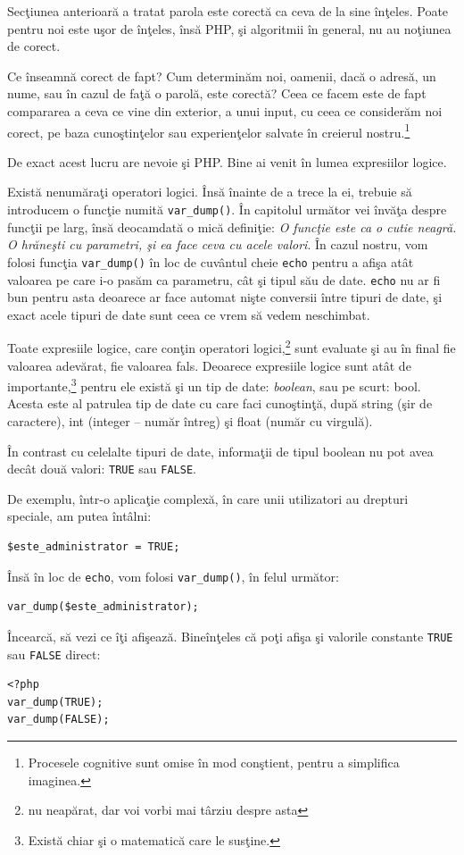 Secţiunea anterioară a tratat {\glqq}parola este corectă{\grqq} ca ceva
de la sine înţeles. Poate pentru noi este uşor de înţeles,
însă PHP, şi algoritmii în general, nu au noţiunea de {\glqq}corect{\grqq}.

Ce înseamnă {\glqq}corect{\grqq} de fapt? Cum determinăm noi, oamenii,
dacă o adresă, un nume, sau în cazul de faţă o parolă, este corectă?
Ceea ce facem este de fapt compararea a ceva ce vine din exterior, a
unui input, cu ceea ce considerăm noi {\glqq}corect{\grqq}, pe baza cunoştinţelor
sau experienţelor {\glqq}salvate{\grqq} în creierul nostru.\footnote{Procesele
cognitive sunt omise în mod conştient, pentru a simplifica imaginea.}

De exact acest lucru are nevoie şi PHP. Bine ai venit în lumea
expresiilor logice. 

Există nenumăraţi operatori logici. Însă înainte de a trece
la ei, trebuie să introducem o funcţie numită \texttt{var\_dump()}.
În capitolul următor vei învăţa despre funcţii pe larg,
însă deocamdată o mică definiţie: \textit{O funcţie este
ca o {\glqq}cutie neagră{\grqq}. O hrăneşti cu parametri, şi ea face ceva cu
acele valori}. În cazul nostru, vom folosi funcţia \texttt{var\_dump()}
în loc de cuvântul cheie \texttt{echo} pentru a afişa atât valoarea
pe care i-o pasăm ca parametru, cât şi tipul său de date. \texttt{echo}
nu ar fi bun pentru asta deoarece ar face automat nişte conversii
între tipuri de date, şi exact acele tipuri de date sunt ceea ce
vrem să vedem neschimbat.


Toate expresiile logice, care conţin operatori
logici,\footnote{nu neapărat, dar voi vorbi mai târziu
despre asta} sunt evaluate şi au în final
fie valoarea {\glqq}adevărat{\grqq}, fie valoarea {\glqq}fals{\grqq}. Deoarece
expresiile logice sunt atât de importante,\footnote{Există
chiar şi o matematică care le susţine.}
pentru ele există şi un tip de date: \textsl{boolean}, sau pe scurt: bool.
Acesta este al patrulea tip de date cu care faci cunoştinţă, după
string (şir de caractere), int (integer -- număr întreg)
şi float (număr cu virgulă).

În contrast cu celelalte tipuri de date, informaţii de tipul
boolean nu pot avea decât două valori: \texttt{TRUE} sau \texttt{FALSE}.

De exemplu, într-o aplicaţie complexă, în care unii utilizatori
au drepturi speciale, am putea întâlni:
\begin{lstlisting}
$este_administrator = TRUE;
\end{lstlisting}
Însă în loc de \texttt{echo}, vom folosi \texttt{var\_dump()}, în felul următor:
\begin{lstlisting}[firstnumber=2]
var_dump($este_administrator);
\end{lstlisting}
Încearcă, să vezi ce îţi afişează. Bineînţeles că poţi afişa şi valorile
constante \texttt{TRUE} sau \texttt{FALSE} direct:
\begin{lstlisting}
<?php
var_dump(TRUE);
var_dump(FALSE);
\end{lstlisting}

